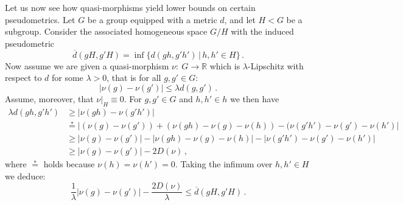 \documentclass[11pt%
]{article}
\theoremstyle{definition}
\newcommand{\R}{{\mathbb{R}}}
\newcommand{\fc}{{:\ }}
\newcommand{\ol}{\overline}
\DeclareMathOperator{\0}{\operatorname{\mathbf{0}}}
\begin{document}
Let us now see how quasi-morphisms yield lower bounds on certain pseudometrics. Let $G$ be a group equipped with a metric $d$, and let $H<G$ be a subgroup. Consider the associated homogeneous space $G/H$ with the induced pseudometric
$$\ol d(gH,g'H) = \inf\{d(gh,g'h')\,|\,h,h'\in H\}\,.$$
Now assume we are given a quasi-morphism $\nu \fc G\to \R$ which is $\lambda$-Lipschitz with respect to $d$ for some $\lambda > 0$, that is for all $g,g' \in G$:
$$|\nu(g)-\nu(g')|\leq \lambda d(g,g')\,.$$
Assume, moreover, that $\nu|_H\equiv 0$. For $g,g'\in G$ and $h,h' \in h$ we then have
\begin{align*}
  \lambda d(gh,g'h') &\geq |\nu(gh) - \nu(g'h')|\\
                     &\stackrel{*}{=} |(\nu(g) - \nu(g')) + (\nu(gh)-\nu(g)-\nu(h)) - (\nu(g'h') - \nu(g') - \nu(h')|\\
                     &\geq |\nu(g) - \nu(g')| - |\nu(gh)-\nu(g)-\nu(h)| - |\nu(g'h') - \nu(g') - \nu(h')|\\
                     &\geq |\nu(g) - \nu(g')| -2D(\nu)\,,
\end{align*}
where $\stackrel{*}{=}$ holds because $\nu(h) = \nu(h') = 0$. Taking the infimum over $h,h' \in H$ we deduce:
$$\frac 1 \lambda |\nu(g)-\nu(g')| - \frac{2D(\nu)}{\lambda}\leq \ol d(gH,g'H)\,.$$
\end{document}
